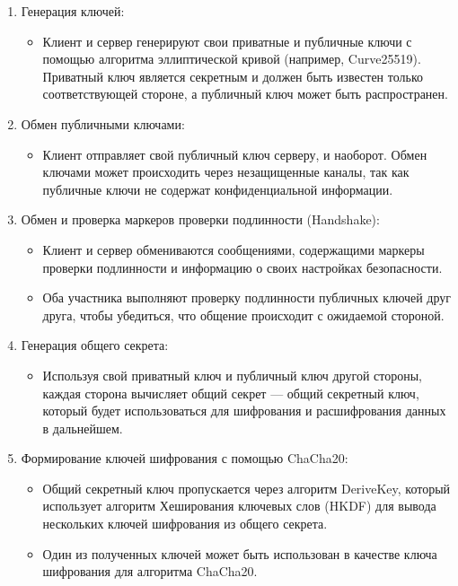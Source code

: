 \documentclass[12pt]{article}
\begin{document}
    \begin{enumerate}
        \item Генерация ключей:
        \begin{itemize}
            \item Клиент и сервер генерируют свои приватные и публичные ключи с помощью алгоритма эллиптической кривой (например, Curve25519). Приватный ключ является секретным и должен быть известен только соответствующей стороне, а публичный ключ может быть распространен.
        \end{itemize}

        \item Обмен публичными ключами:
        \begin{itemize}
            \item Клиент отправляет свой публичный ключ серверу, и наоборот. Обмен ключами может происходить через незащищенные каналы, так как публичные ключи не содержат конфиденциальной информации.
        \end{itemize}

        \item Обмен и проверка маркеров проверки подлинности (Handshake):
        \begin{itemize}
            \item Клиент и сервер обмениваются сообщениями, содержащими маркеры проверки подлинности и информацию о своих настройках безопасности.
            \item Оба участника выполняют проверку подлинности публичных ключей друг друга, чтобы убедиться, что общение происходит с ожидаемой стороной.
        \end{itemize}

        \item Генерация общего секрета:
        \begin{itemize}
            \item Используя свой приватный ключ и публичный ключ другой стороны, каждая сторона вычисляет общий секрет — общий секретный ключ, который будет использоваться для шифрования и расшифрования данных в дальнейшем.
        \end{itemize}

        \item Формирование ключей шифрования с помощью ChaCha20:
        \begin{itemize}
            \item Общий секретный ключ пропускается через алгоритм DeriveKey, который использует алгоритм Хеширования ключевых слов (HKDF) для вывода нескольких ключей шифрования из общего секрета.
            \item Один из полученных ключей может быть использован в качестве ключа шифрования для алгоритма ChaCha20.
        \end{itemize}


\end{enumerate}
\end{document}
